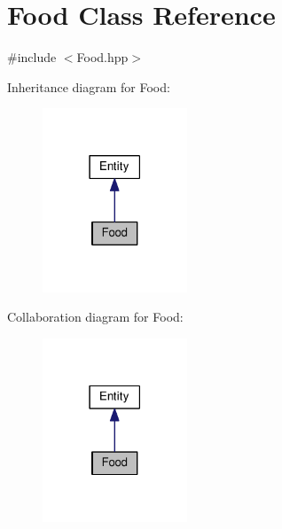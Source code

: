 \hypertarget{classFood}{}\section{Food Class Reference}
\label{classFood}


{\ttfamily \#include $<$Food.\+hpp$>$}



Inheritance diagram for Food\+:\nopagebreak
\begin{figure}[H]
\begin{center}
\leavevmode
\includegraphics[width=122pt]{classFood__inherit__graph}
\end{center}
\end{figure}


Collaboration diagram for Food\+:\nopagebreak
\begin{figure}[H]
\begin{center}
\leavevmode
\includegraphics[width=122pt]{classFood__coll__graph}
\end{center}
\end{figure}
